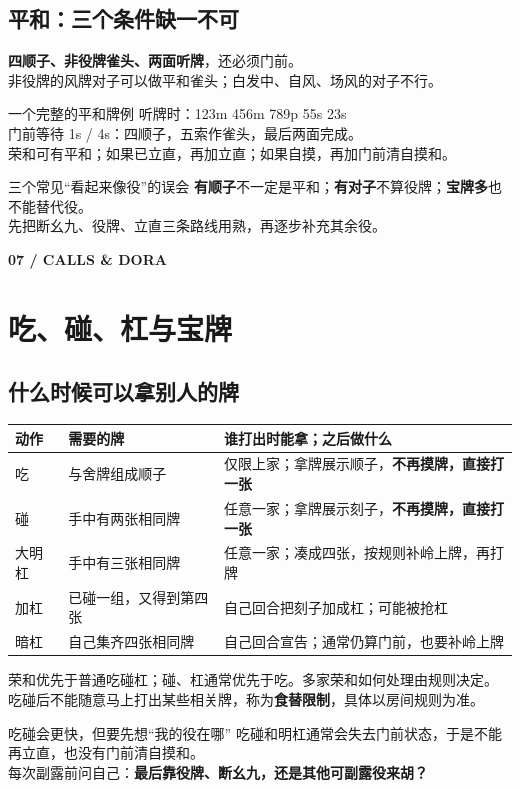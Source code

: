 \documentclass[UTF8,a4paper,zihao=5,fontset=fandol]{ctexart}
\newcommand{\pageintro}[3]{\clearpage\phantomsection\label{#1}
 {\small\sffamily\bfseries\color{gold}#2}\par\vspace{2pt}\section{#3}}
\newcommand{\notation}[1]{{\ttfamily\color{teal}#1}}
\begin{document}
\subsection{平和：三个条件缺一不可}
\textbf{四顺子、非役牌雀头、两面听牌}，还必须门前。\\
非役牌的风牌对子可以做平和雀头；白发中、自风、场风的对子不行。
\begin{example}{一个完整的平和牌例}
听牌时：\notation{123m 456m 789p 55s 23s}\\
门前等待 \notation{1s / 4s}：四顺子，五索作雀头，最后两面完成。\\
荣和可有平和；如果已立直，再加立直；如果自摸，再加门前清自摸和。
\end{example}

\begin{alert}{三个常见“看起来像役”的误会}
\textbf{有顺子}不一定是平和；\textbf{有对子}不算役牌；\textbf{宝牌多}也不能替代役。\\
先把断幺九、役牌、立直三条路线用熟，再逐步补充其余役。
\end{alert}

\pageintro{calls}{07 / CALLS \& DORA}{吃、碰、杠与宝牌}
\subsection{什么时候可以拿别人的牌}
\par\noindent\begin{tabularx}{\linewidth}{L{13mm}L{30mm}Y}
\toprule
动作 & 需要的牌 & 谁打出时能拿；之后做什么\\
\midrule
吃 & 与舍牌组成顺子 & 仅限上家；拿牌展示顺子，\textbf{不再摸牌，直接打一张}\\
碰 & 手中有两张相同牌 & 任意一家；拿牌展示刻子，\textbf{不再摸牌，直接打一张}\\
大明杠 & 手中有三张相同牌 & 任意一家；凑成四张，按规则补岭上牌，再打牌\\
加杠 & 已碰一组，又得到第四张 & 自己回合把刻子加成杠；可能被抢杠\\
暗杠 & 自己集齐四张相同牌 & 自己回合宣告；通常仍算门前，也要补岭上牌\\
\bottomrule
\end{tabularx}\par\vspace{3pt}
荣和优先于普通吃碰杠；碰、杠通常优先于吃。多家荣和如何处理由规则决定。
吃碰后不能随意马上打出某些相关牌，称为\textbf{食替限制}，具体以房间规则为准。

\begin{note}{吃碰会更快，但要先想“我的役在哪”}
吃碰和明杠通常会失去门前状态，于是不能再立直，也没有门前清自摸和。\\
每次副露前问自己：\textbf{最后靠役牌、断幺九，还是其他可副露役来胡？}
\end{note}
\end{document}

